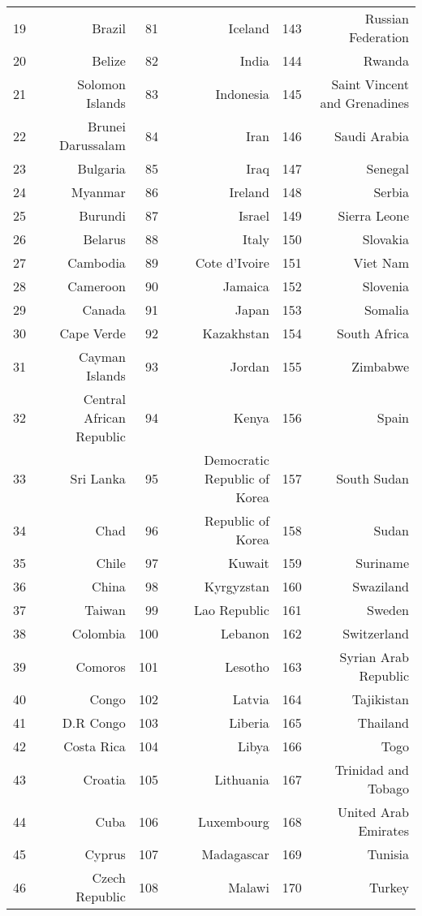 \begin{table}[ht]
\begin{tabular}{r|r|r|r|r|r|}
19 & Brazil & 81 & Iceland & 143& Russian Federation \\ 
20 & Belize & 82 & India & 144& Rwanda \\ 
21 & Solomon Islands & 83 & Indonesia & 145 & Saint Vincent and Grenadines \\ 
22 & Brunei Darussalam & 84 & Iran & 146 & Saudi Arabia \\ 
23 & Bulgaria & 85 & Iraq & 147 & Senegal \\ 
24 & Myanmar & 86 & Ireland & 148 & Serbia \\ 
25 & Burundi & 87 & Israel & 149 & Sierra Leone \\ 
26 & Belarus & 88 & Italy & 150 & Slovakia \\ 
27 & Cambodia & 89 & Cote d'Ivoire & 151 & Viet Nam \\ 
28 & Cameroon & 90 & Jamaica & 152 & Slovenia \\ 
29 & Canada & 91 & Japan & 153 & Somalia \\ 
30 & Cape Verde & 92 & Kazakhstan & 154 & South Africa \\ 
31 & Cayman Islands & 93 & Jordan & 155 & Zimbabwe \\ 
32 & Central African Republic & 94 & Kenya & 156 & Spain \\ 
33 & Sri Lanka & 95 & Democratic Republic of Korea & 157 & South Sudan \\ 
34 & Chad & 96 & Republic of Korea & 158 & Sudan \\ 
35 & Chile & 97 & Kuwait & 159 & Suriname \\ 
36 & China & 98 & Kyrgyzstan & 160 & Swaziland \\ 
37 & Taiwan & 99 & Lao Republic & 161 & Sweden \\ 
38 & Colombia & 100 & Lebanon & 162 & Switzerland \\ 
39 & Comoros & 101 & Lesotho & 163 & Syrian Arab Republic \\ 
40 & Congo & 102 & Latvia & 164 & Tajikistan \\ 
41 & D.R Congo & 103 & Liberia & 165 & Thailand \\ 
42 & Costa Rica & 104 & Libya & 166 & Togo \\ 
43 & Croatia & 105 & Lithuania & 167 & Trinidad and Tobago \\ 
44 & Cuba & 106 & Luxembourg & 168 & United Arab Emirates \\ 
45 & Cyprus & 107 & Madagascar & 169 & Tunisia \\ 
46 & Czech Republic & 108 & Malawi & 170 & Turkey \\ 

\end{tabular}
\end{table}
